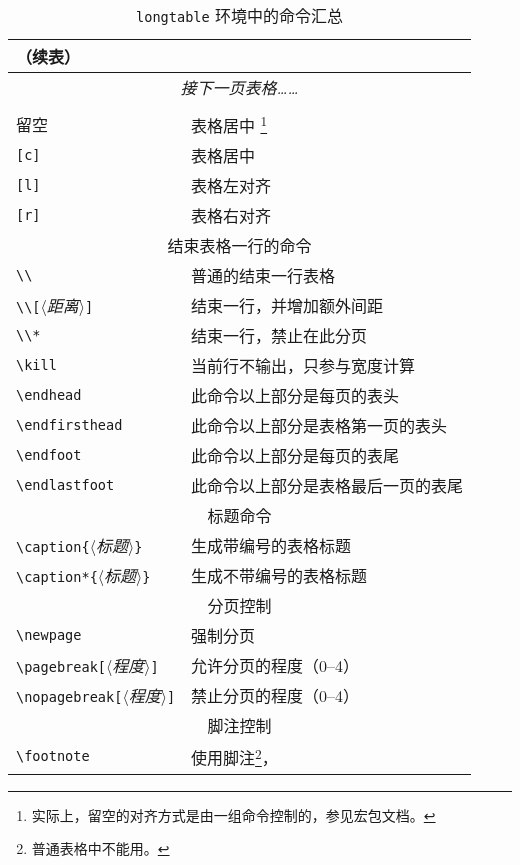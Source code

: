\newcommand\meta[1]{\emph{$\langle$#1$\rangle$}}
\begin{longtable}{|l|l|}
\caption{\texttt{longtable} 环境中的命令汇总} \\
\hline
\endfirsthead
\multicolumn{2}{l}{（续表）} \\
\hline
\endhead
\hline
\multicolumn{2}{c}{\itshape 接下一页表格……} \\[2ex]
\endfoot
\hline
\endlastfoot
\multicolumn{2}{|c|}{环境的水平对齐可选项} \\ \hline
留空 & 表格居中%
\footnote{实际上，留空的对齐方式是由一组命令控制的，参见宏包文档。} \\
\verb=[c]= & 表格居中 \\
\verb=[l]= & 表格左对齐 \\
\verb=[r]= & 表格右对齐 \\
\hline \multicolumn{2}{|c|}{结束表格一行的命令} \\ \hline
\verb=\\= & 普通的结束一行表格 \\
\verb=\\[=\meta{距离}\verb=]= & 结束一行，并增加额外间距 \\
\verb=\\*= & 结束一行，禁止在此分页 \\
\verb=\kill= & 当前行不输出，只参与宽度计算 \\
\verb=\endhead= & 此命令以上部分是每页的表头 \\
\verb=\endfirsthead= & 此命令以上部分是表格第一页的表头 \\
\verb=\endfoot= & 此命令以上部分是每页的表尾 \\
\verb=\endlastfoot= & 此命令以上部分是表格最后一页的表尾 \\
\hline \multicolumn{2}{|c|}{标题命令} \\ \hline
\verb=\caption{=\meta{标题}\verb=}= & 生成带编号的表格标题 \\
\verb=\caption*{=\meta{标题}\verb=}= & 生成不带编号的表格标题 \\
\hline \multicolumn{2}{|c|}{分页控制} \\ \hline
\verb=\newpage= & 强制分页 \\
\verb=\pagebreak[=\meta{程度}\verb=]= & 允许分页的程度（0--4） \\
\verb=\nopagebreak[=\meta{程度}\verb=]= & 禁止分页的程度（0--4） \\
\hline \multicolumn{2}{|c|}{脚注控制} \\ \hline
\verb=\footnote= & 使用脚注\footnote{普通表格中不能用。}，

\end{longtable}
